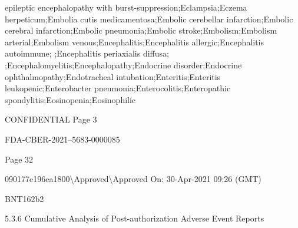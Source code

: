 \begin{refsection}
\begin{tcolorbox}[quote]
epileptic encephalopathy with burst-suppression;Eclampsia;Eczema herpeticum;Embolia cutis medicamentosa;Embolic cerebellar infarction;Embolic cerebral infarction;Embolic pneumonia;Embolic stroke;Embolism;Embolism arterial;Embolism venous;Encephalitis;Encephalitis allergic;Encephalitis autoimmune; ;Encephalitis periaxialis diffusa; ;Encephalomyelitis;Encephalopathy;Endocrine disorder;Endocrine ophthalmopathy;Endotracheal intubation;Enteritis;Enteritis leukopenic;Enterobacter pneumonia;Enterocolitis;Enteropathic spondylitis;Eosinopenia;Eosinophilic

CONFIDENTIAL Page 3

FDA-CBER-2021--5683-0000085

Page 32

090177e196ea1800\textbackslash{}Approved\textbackslash{}Approved On: 30-Apr-2021 09:26 (GMT)

BNT162b2

5.3.6 Cumulative Analysis of Post-authorization Adverse Event Reports


\end{tcolorbox}
\end{refsection}
